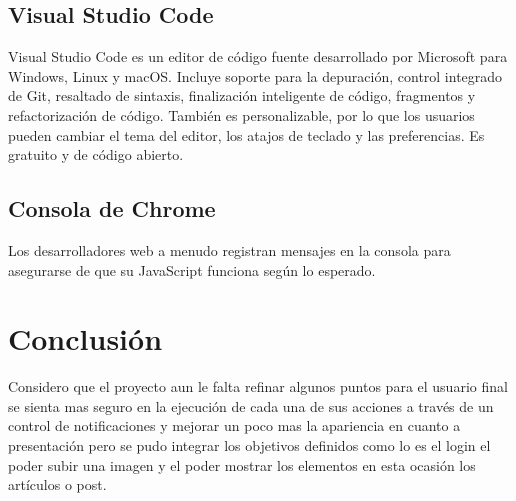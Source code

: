 \documentclass[60pt]{article}
\begin{document}
\subsection{Visual Studio Code}
Visual Studio Code es un editor de código fuente desarrollado por Microsoft para Windows, Linux y macOS. Incluye soporte para la depuración, control integrado de Git, resaltado de sintaxis, finalización inteligente de código, fragmentos y refactorización de código. También es personalizable, por lo que los usuarios pueden cambiar el tema del editor, los atajos de teclado y las preferencias. Es gratuito y de código abierto.
\subsection{Consola de Chrome}
Los desarrolladores web a menudo registran mensajes en la consola para asegurarse de que su JavaScript funciona según lo esperado.
\section{Conclusión}
Considero que el proyecto aun le falta refinar algunos puntos para el usuario final se sienta mas seguro en la ejecución de cada una de sus acciones a través de un control de notificaciones y mejorar un poco mas la apariencia en cuanto a presentación pero se pudo integrar los objetivos definidos como lo es el login el poder subir una imagen y el poder mostrar los elementos en esta ocasión los artículos o post.
\end{document}
